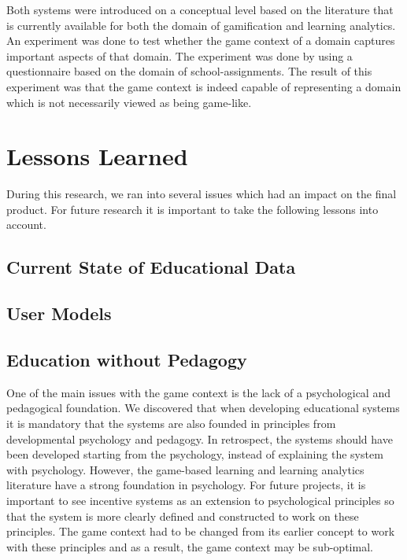 \documentclass[11pt]{article}
\begin{document}
Both systems were introduced on a conceptual level based on the literature that is currently available for both the domain of gamification and learning analytics. An experiment was done to test whether the game context of a domain captures important aspects of that domain. The experiment was done by using a questionnaire based on the domain of school-assignments. The result of this experiment was that the game context is indeed capable of representing a domain which is not necessarily viewed as being game-like. 


\section{Lessons Learned}
During this research, we ran into several issues which had an impact on the final product. For future research it is important to take the following lessons into account.

\subsection{Current State of Educational Data}

\subsection{User Models}


\subsection{Education without Pedagogy}
One of the main issues with the game context is the lack of a psychological and pedagogical foundation. We discovered that when developing educational systems it is mandatory that the systems are also founded in principles from developmental psychology and pedagogy. In retrospect, the systems should have been developed starting from the psychology, instead of explaining the system with psychology. However, the game-based learning and learning analytics literature have a strong foundation in psychology. For future projects, it is important to see incentive systems as an extension to psychological principles so that the system is more clearly defined and constructed to work on these principles. The game context had to be changed from its earlier concept to work with these principles and as a result, the game context may be sub-optimal.
\end{document}
